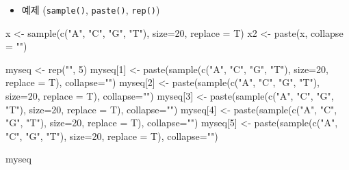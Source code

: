 \documentclass[
]{book}
\newenvironment{Shaded}{\begin{snugshade}}{\end{snugshade}}
\newcommand{\AttributeTok}[1]{\textcolor[rgb]{0.77,0.63,0.00}{#1}}
\newcommand{\DecValTok}[1]{\textcolor[rgb]{0.00,0.00,0.81}{#1}}
\newcommand{\FunctionTok}[1]{\textcolor[rgb]{0.00,0.00,0.00}{#1}}
\newcommand{\NormalTok}[1]{#1}
\newcommand{\OtherTok}[1]{\textcolor[rgb]{0.56,0.35,0.01}{#1}}
\newcommand{\StringTok}[1]{\textcolor[rgb]{0.31,0.60,0.02}{#1}}
\providecommand{\tightlist}{%
  \setlength{\itemsep}{0pt}\setlength{\parskip}{0pt}}
\begin{document}
\begin{itemize}
\tightlist
\item
  예제 (\texttt{sample()}, \texttt{paste()}, \texttt{rep()})
\end{itemize}

\begin{Shaded}
\begin{Highlighting}[]

\NormalTok{x }\OtherTok{\textless{}{-}} \FunctionTok{sample}\NormalTok{(}\FunctionTok{c}\NormalTok{(}\StringTok{"A"}\NormalTok{, }\StringTok{"C"}\NormalTok{, }\StringTok{"G"}\NormalTok{, }\StringTok{"T"}\NormalTok{), }\AttributeTok{size=}\DecValTok{20}\NormalTok{, }\AttributeTok{replace =}\NormalTok{ T)}
\NormalTok{x2 }\OtherTok{\textless{}{-}} \FunctionTok{paste}\NormalTok{(x, }\AttributeTok{collapse =} \StringTok{""}\NormalTok{)}

\NormalTok{myseq }\OtherTok{\textless{}{-}} \FunctionTok{rep}\NormalTok{(}\StringTok{""}\NormalTok{, }\DecValTok{5}\NormalTok{)}
\NormalTok{myseq[}\DecValTok{1}\NormalTok{] }\OtherTok{\textless{}{-}} \FunctionTok{paste}\NormalTok{(}\FunctionTok{sample}\NormalTok{(}\FunctionTok{c}\NormalTok{(}\StringTok{"A"}\NormalTok{, }\StringTok{"C"}\NormalTok{, }\StringTok{"G"}\NormalTok{, }\StringTok{"T"}\NormalTok{), }\AttributeTok{size=}\DecValTok{20}\NormalTok{, }\AttributeTok{replace =}\NormalTok{ T), }\AttributeTok{collapse=}\StringTok{""}\NormalTok{)}
\NormalTok{myseq[}\DecValTok{2}\NormalTok{] }\OtherTok{\textless{}{-}} \FunctionTok{paste}\NormalTok{(}\FunctionTok{sample}\NormalTok{(}\FunctionTok{c}\NormalTok{(}\StringTok{"A"}\NormalTok{, }\StringTok{"C"}\NormalTok{, }\StringTok{"G"}\NormalTok{, }\StringTok{"T"}\NormalTok{), }\AttributeTok{size=}\DecValTok{20}\NormalTok{, }\AttributeTok{replace =}\NormalTok{ T), }\AttributeTok{collapse=}\StringTok{""}\NormalTok{)}
\NormalTok{myseq[}\DecValTok{3}\NormalTok{] }\OtherTok{\textless{}{-}} \FunctionTok{paste}\NormalTok{(}\FunctionTok{sample}\NormalTok{(}\FunctionTok{c}\NormalTok{(}\StringTok{"A"}\NormalTok{, }\StringTok{"C"}\NormalTok{, }\StringTok{"G"}\NormalTok{, }\StringTok{"T"}\NormalTok{), }\AttributeTok{size=}\DecValTok{20}\NormalTok{, }\AttributeTok{replace =}\NormalTok{ T), }\AttributeTok{collapse=}\StringTok{""}\NormalTok{)}
\NormalTok{myseq[}\DecValTok{4}\NormalTok{] }\OtherTok{\textless{}{-}} \FunctionTok{paste}\NormalTok{(}\FunctionTok{sample}\NormalTok{(}\FunctionTok{c}\NormalTok{(}\StringTok{"A"}\NormalTok{, }\StringTok{"C"}\NormalTok{, }\StringTok{"G"}\NormalTok{, }\StringTok{"T"}\NormalTok{), }\AttributeTok{size=}\DecValTok{20}\NormalTok{, }\AttributeTok{replace =}\NormalTok{ T), }\AttributeTok{collapse=}\StringTok{""}\NormalTok{)}
\NormalTok{myseq[}\DecValTok{5}\NormalTok{] }\OtherTok{\textless{}{-}} \FunctionTok{paste}\NormalTok{(}\FunctionTok{sample}\NormalTok{(}\FunctionTok{c}\NormalTok{(}\StringTok{"A"}\NormalTok{, }\StringTok{"C"}\NormalTok{, }\StringTok{"G"}\NormalTok{, }\StringTok{"T"}\NormalTok{), }\AttributeTok{size=}\DecValTok{20}\NormalTok{, }\AttributeTok{replace =}\NormalTok{ T), }\AttributeTok{collapse=}\StringTok{""}\NormalTok{)}

\NormalTok{myseq}
\end{Highlighting}
\end{Shaded}
\end{document}

